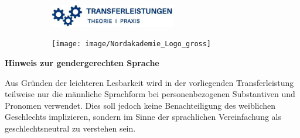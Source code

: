 \pagebreak
\thispagestyle{empty}

\setlength{\parindent}{0pt}

\begin{figure}[t]
	\vspace*{-2.9\baselineskip}
	\begin{subfigure}[b]{0.6\textwidth}
		\includegraphics[height=1cm, left]{image/transferleistung}
	\end{subfigure}
	\begin{subfigure}[b]{0.4\textwidth}
		\texttt{[image: image/Nordakademie\_Logo\_gross]}
	\end{subfigure}
\end{figure}
\begin{figure}[t]
\end{figure}


\vspace*{\fill}

\large
\textcolor{blue!30!black}{\textbf{Hinweis zur gendergerechten Sprache}}
\newline

\normalsize
Aus Gründen der leichteren Lesbarkeit wird in der vorliegenden Transferleistung teilweise nur die männliche Sprachform bei personenbezogenen Substantiven und Pronomen verwendet. Dies soll jedoch keine Benachteiligung des weiblichen Geschlechts implizieren, sondern im Sinne der sprachlichen Vereinfachung als geschlechtsneutral zu verstehen sein. 

\vspace*{\fill}
